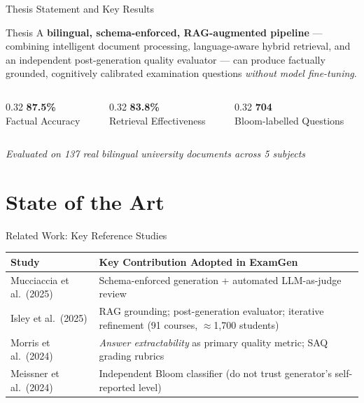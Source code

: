 \documentclass[aspectratio=169]{beamer}
\begin{document}
\begin{frame}{Thesis Statement and Key Results}
  \begin{block}{Thesis}
    A \textbf{bilingual, schema-enforced, RAG-augmented pipeline} --- combining
    intelligent document processing, language-aware hybrid retrieval, and an
    independent post-generation quality evaluator --- can produce factually grounded,
    cognitively calibrated examination questions \emph{without model fine-tuning}.
  \end{block}

  \vspace{8pt}
  \begin{columns}[T]
    \begin{column}{0.32\textwidth}
      \centering
      {\Large\bfseries\color{accent} 87.5\%}\\[2pt]
      Factual Accuracy
    \end{column}
    \begin{column}{0.32\textwidth}
      \centering
      {\Large\bfseries\color{accent} 83.8\%}\\[2pt]
      Retrieval Effectiveness
    \end{column}
    \begin{column}{0.32\textwidth}
      \centering
      {\Large\bfseries\color{accent} 704}\\[2pt]
      Bloom-labelled Questions
    \end{column}
  \end{columns}

  \vspace{8pt}
  \centering
  \textit{Evaluated on 137 real bilingual university documents across 5 subjects}
\end{frame}

\section{State of the Art}

\begin{frame}{Related Work: Key Reference Studies}
  \begin{tabular}{lp{7.5cm}}
    \toprule
    \textbf{Study} & \textbf{Key Contribution Adopted in ExamGen} \\
    \midrule
    Mucciaccia et al.\ (2025) &
      Schema-enforced generation + automated LLM-as-judge review \\[4pt]
    Isley et al.\ (2025) &
      RAG grounding; post-generation evaluator; iterative refinement
      (91 courses, $\approx$1,700 students) \\[4pt]
    Morris et al.\ (2024) &
      \textit{Answer extractability} as primary quality metric;
      SAQ grading rubrics \\[4pt]
    Meissner et al.\ (2024) &
      Independent Bloom classifier (do not trust generator's self-reported level) \\
    \bottomrule
  \end{tabular}
\end{frame}
\end{document}
